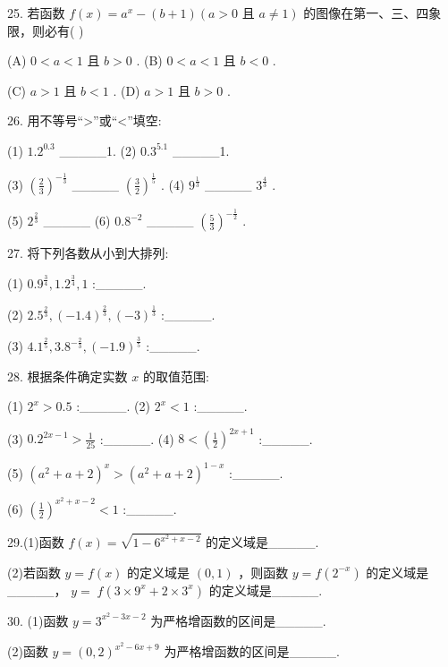 \documentclass[10pt]{article}
\begin{document}
25. 若函数 \(f\left( x\right)  = {a}^{x} - \left( {b + 1}\right) \left( {a > 0\text{ 且 }a \neq  1}\right)\) 的图像在第一、三、四象限，则必有( )

(A) \(0 < a < 1\) 且 \(b > 0\) . (B) \(0 < a < 1\) 且 \(b < 0\) .

(C) \(a > 1\) 且 \(b < 1\) . (D) \(a > 1\) 且 \(b > 0\) .

26. 用不等号“>”或“<”填空:

(1) \({1.2}^{0.3}\) \_\_\_\_\_1. (2) \({0.3}^{5.1}\) \_\_\_\_\_1.

(3) \({\left( \frac{2}{3}\right) }^{-\frac{1}{3}}\) \_\_\_\_\_ \({\left( \frac{3}{2}\right) }^{\frac{1}{5}}\) . (4) \({9}^{\frac{1}{3}}\) \_\_\_\_\_ \({3}^{\frac{4}{3}}\) .

(5) \({2}^{\frac{2}{3}}\) \_\_\_\_\_ (6) \({0.8}^{-2}\) \_\_\_\_\_ \({\left( \frac{5}{3}\right) }^{-\frac{1}{2}}\) .

27. 将下列各数从小到大排列:

(1) \({0.9}^{\frac{3}{4}},{1.2}^{\frac{3}{4}},1\) :\_\_\_\_\_.

(2) \({2.5}^{\frac{2}{3}},{\left( -{1.4}\right) }^{\frac{2}{3}},{\left( -3\right) }^{\frac{1}{3}}\) :\_\_\_\_\_.

(3) \({4.1}^{\frac{2}{5}},{3.8}^{-\frac{2}{3}},{\left( -{1.9}\right) }^{\frac{3}{5}}\) :\_\_\_\_\_.

28. 根据条件确定实数 \(x\) 的取值范围:

(1) \({2}^{x} > {0.5}\) :\_\_\_\_\_. (2) \({2}^{x} < 1\) :\_\_\_\_\_.

(3) \({0.2}^{{2x} - 1} > \frac{1}{25}\) :\_\_\_\_\_. (4) \(8 < {\left( \frac{1}{2}\right) }^{{2x} + 1}\) :\_\_\_\_\_.

(5) \({\left( {a}^{2} + a + 2\right) }^{x} > {\left( {a}^{2} + a + 2\right) }^{1 - x}\) :\_\_\_\_\_.

(6) \({\left( \frac{1}{2}\right) }^{{x}^{2} + x - 2} < 1\) :\_\_\_\_\_.

29.(1)函数 \(f\left( x\right)  = \sqrt{1 - {6}^{{x}^{2} + x - 2}}\) 的定义域是\_\_\_\_\_.

(2)若函数 \(y = f\left( x\right)\) 的定义域是 \(\left( {0,1}\right)\) ，则函数 \(y = f\left( {2}^{-x}\right)\) 的定义域是\_\_\_\_\_， \(y = \; f\left( {3 \times  {9}^{x} + 2 \times  {3}^{x}}\right)\) 的定义域是\_\_\_\_\_.

30. (1)函数 \(y = {3}^{{x}^{2} - {3x} - 2}\) 为严格增函数的区间是\_\_\_\_\_.

(2)函数 \(y = {\left( 0,2\right) }^{{x}^{2} - {6x} + 9}\) 为严格增函数的区间是\_\_\_\_\_.
\end{document}

